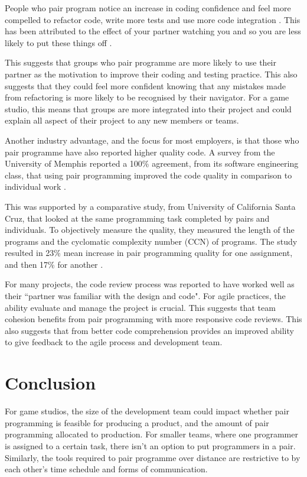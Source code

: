 \documentclass{scrartcl}
\begin{document}
People who pair program notice an increase in coding confidence and feel more compelled to refactor code, write more tests and use more code integration \cite{Sherrell:2006}. This has been attributed to the effect of your partner watching you and so you are less likely to put these things off \cite{Beck:2000}. 

This suggests that groups who pair programme are more likely to use their partner as the motivation to improve their coding and testing practice. This also suggests that they could feel more confident knowing that any mistakes made from refactoring is more likely to be recognised by their navigator. For a game studio, this means that groups are more integrated into their project and could explain all aspect of their project to any new members or teams.

Another industry advantage, and the focus for most employers, is that those who pair programme have also reported higher quality code. A survey from the University of Memphis reported a 100\% agreement, from its software engineering class, that using pair programming improved the code quality in comparison to individual work \cite{Sherrell:2006}.

This was supported by a comparative study, from University of California Santa Cruz, that looked at the same programming task completed by pairs and individuals. To objectively measure the quality, they measured the length of the programs and the cyclomatic complexity number (CCN)\cite{Xenos:2000} of programs. The study resulted in 23\% mean increase in pair programming quality for one assignment, and then 17\% for another \cite{Hanks:2004}.

For many projects, the code review process was reported to have worked well as their ``partner was familiar with the design and code"\cite{Vanhanen:2007}. For agile practices, the ability evaluate and manage the project is crucial. This suggests that team cohesion benefits from pair programming with more responsive code reviews. This also suggests that from better code comprehension provides an improved ability to give feedback to the agile process and development team.

\section*{Conclusion}
For game studios, the size of the development team could impact whether pair programming is feasible for producing a product, and the amount of pair programming allocated to production. For smaller teams, where one programmer is assigned to a certain task, there isn't an option to put programmers in a pair. Similarly, the tools required to pair programme over distance are restrictive to by each other's time schedule and forms of communication.
\end{document}
